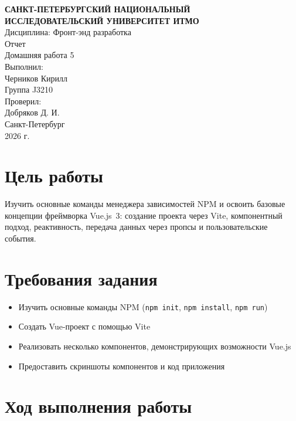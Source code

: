 \documentclass[12pt,a4paper]{article}
\begin{document}
\begin{center}
\textbf{САНКТ-ПЕТЕРБУРГСКИЙ НАЦИОНАЛЬНЫЙ}\\
\textbf{ИССЛЕДОВАТЕЛЬСКИЙ УНИВЕРСИТЕТ ИТМО}\\[1.5cm]

Дисциплина: Фронт-энд разработка\\[1.5cm]

Отчет\\[1.5cm]

Домашняя работа 5\\[2cm]

Выполнил:\\
Черников Кирилл\\
Группа J3210\\[0.8cm]

Проверил:\\
Добряков Д. И.\\[2cm]

Санкт-Петербург\\
2026 г.
\end{center}

\newpage

\section{Цель работы}

Изучить основные команды менеджера зависимостей NPM и освоить базовые концепции фреймворка Vue.js~3: создание проекта через Vite, компонентный подход, реактивность, передача данных через пропсы и пользовательские события.

\section{Требования задания}

\begin{itemize}
  \item Изучить основные команды NPM (\texttt{npm init}, \texttt{npm install}, \texttt{npm run})
  \item Создать Vue-проект с помощью Vite
  \item Реализовать несколько компонентов, демонстрирующих возможности Vue.js
  \item Предоставить скриншоты компонентов и код приложения
\end{itemize}

\section{Ход выполнения работы}
\end{document}
